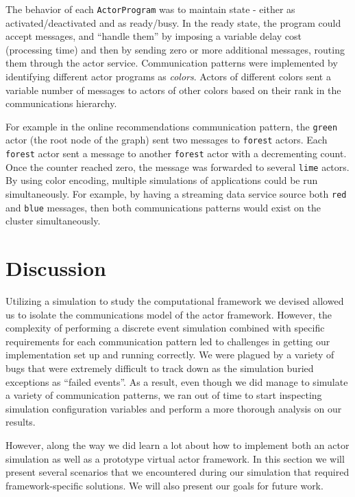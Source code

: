\documentclass[draftclsnofoot,onecolumn,conference,11pt]{IEEEtran}
\begin{document}
The behavior of each \texttt{ActorProgram} was to maintain state - either as activated/deactivated and as ready/busy. In the ready state, the program could accept messages, and ``handle them'' by imposing a variable delay cost (processing time) and then by sending zero or more additional messages, routing them through the actor service.  Communication patterns were implemented by identifying different actor programs as \textit{colors}. Actors of different colors sent a variable number of messages to actors of other colors based on their rank in the communications hierarchy.

For example in the online recommendations communication pattern, the \texttt{green} actor (the root node of the graph) sent two messages to \texttt{forest} actors. Each \texttt{forest} actor sent a message to another \texttt{forest} actor with a decrementing count. Once the counter reached zero, the message was forwarded to several \texttt{lime} actors. By using color encoding, multiple simulations of applications could be run simultaneously. For example, by having a streaming data service source both \texttt{red} and \texttt{blue} messages, then both communications patterns would exist on the cluster simultaneously.

\section{Discussion}

Utilizing a simulation to study the computational framework we devised allowed us to isolate the communications model of the actor framework. However, the complexity of performing a discrete event simulation combined with specific requirements for each communication pattern led to challenges in getting our implementation set up and running correctly. We were plagued by a variety of bugs that were extremely difficult to track down as the simulation buried exceptions as ``failed events''. As a result, even though we did manage to simulate a variety of communication patterns, we ran out of time to start inspecting simulation configuration variables and perform a more thorough analysis on our results.

However, along the way we did learn a lot about how to implement both an actor simulation as well as a prototype virtual actor framework. In this section we will present several scenarios that we encountered during our simulation that required framework-specific solutions. We will also present our goals for future work.
\end{document}
